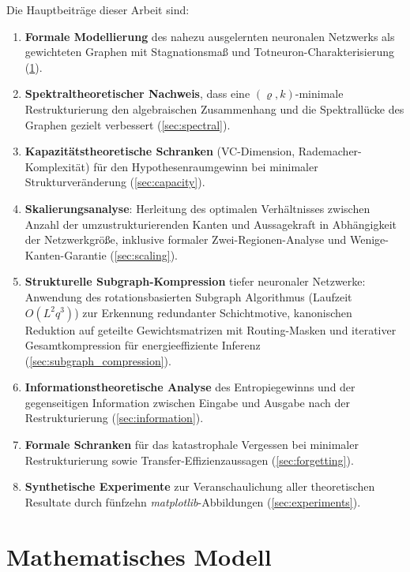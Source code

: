 ﻿\documentclass[12pt, a4paper, openany]{report}
\begin{document}
Die Hauptbeiträge dieser Arbeit sind:
\begin{enumerate}[label=(\roman*)]
  \item \textbf{Formale Modellierung} des nahezu ausgelernten neuronalen
    Netzwerks als gewichteten Graphen mit Stagnationsmaß und
    Totneuron-Charakterisierung (\cref{sec:model}).
  \item \textbf{Spektraltheoretischer Nachweis}, dass eine
    $(\varrho,k)$-minimale Restrukturierung den algebraischen
    Zusammenhang und die Spektrallücke des Graphen gezielt verbessert
    (\cref{sec:spectral}).
  \item \textbf{Kapazitätstheoretische Schranken} (VC-Dimension,
    Rademacher-Komplexität) für den Hypothesenraumgewinn bei minimaler
    Strukturveränderung (\cref{sec:capacity}).
  \item \textbf{Skalierungsanalyse}: Herleitung des optimalen Verhältnisses
    zwischen Anzahl der umzustrukturierenden Kanten und Aussagekraft in
    Abhängigkeit der Netzwerkgröße, inklusive formaler Zwei-Regionen-Analyse
    und Wenige-Kanten-Garantie (\cref{sec:scaling}).
  \item \textbf{Strukturelle Subgraph-Kompression} tiefer neuronaler
    Netzwerke: Anwendung des rotationsbasierten Subgraph Algorithmus
    (Laufzeit $O(L^2 q^3)$) zur Erkennung redundanter Schichtmotive,
    kanonischen Reduktion auf geteilte Gewichtsmatrizen mit Routing-Masken
    und iterativer Gesamtkompression für energieeffiziente Inferenz
    (\cref{sec:subgraph_compression}).
  \item \textbf{Informationstheoretische Analyse} des Entropiegewinns
    und der gegenseitigen Information zwischen Eingabe und Ausgabe nach
    der Restrukturierung (\cref{sec:information}).
  \item \textbf{Formale Schranken} für das katastrophale Vergessen bei
    minimaler Restrukturierung sowie Transfer-Effizienzaussagen
    (\cref{sec:forgetting}).
  \item \textbf{Synthetische Experimente} zur Veranschaulichung aller
    theoretischen Resultate durch fünfzehn \textit{matplotlib}-Abbildungen
    (\cref{sec:experiments}).
\end{enumerate}

\chapter{Mathematisches Modell}
\label{sec:model}
\end{document}
